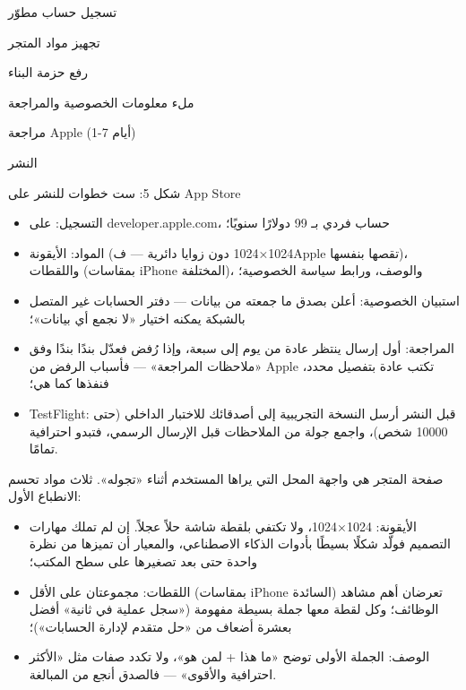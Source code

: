 
تسجيل حساب مطوّر

تجهيز مواد المتجر

رفع حزمة البناء

ملء معلومات الخصوصية والمراجعة

مراجعة Apple (1-7 أيام)

النشر

\begin{center}\small\color{gray}شكل 5: ست خطوات للنشر على App Store\end{center}

\begin{itemize}
  \item التسجيل: على developer.apple.com، حساب فردي بـ 99 دولارًا سنويًا؛
  \item المواد: الأيقونة (1024×1024 دون زوايا دائرية — فApple تقصها بنفسها)، واللقطات (بمقاسات iPhone المختلفة)، والوصف، ورابط سياسة الخصوصية؛
  \item استبيان الخصوصية: أعلن بصدق ما جمعته من بيانات — دفتر الحسابات غير المتصل بالشبكة يمكنه اختيار «لا نجمع أي بيانات»؛
  \item المراجعة: أول إرسال ينتظر عادة من يوم إلى سبعة، وإذا رُفض فعدّل بندًا بندًا وفق «ملاحظات المراجعة» — فأسباب الرفض من Apple تكتب عادة بتفصيل محدد، فنفذها كما هي؛
  \item TestFlight: قبل النشر أرسل النسخة التجريبية إلى أصدقائك للاختبار الداخلي (حتى 10000 شخص)، واجمع جولة من الملاحظات قبل الإرسال الرسمي، فتبدو احترافية تمامًا.
\end{itemize}


صفحة المتجر هي واجهة المحل التي يراها المستخدم أثناء «تجوله». ثلاث مواد تحسم الانطباع الأول:

\begin{itemize}
  \item الأيقونة: 1024×1024، ولا تكتفي بلقطة شاشة حلاً عجلاً. إن لم تملك مهارات التصميم فولّد شكلًا بسيطًا بأدوات الذكاء الاصطناعي، والمعيار أن تميزها من نظرة واحدة حتى بعد تصغيرها على سطح المكتب؛
  \item اللقطات: مجموعتان على الأقل (بمقاسات iPhone السائدة) تعرضان أهم مشاهد الوظائف؛ وكل لقطة معها جملة بسيطة مفهومة («سجل عملية في ثانية» أفضل بعشرة أضعاف من «حل متقدم لإدارة الحسابات»)؛
  \item الوصف: الجملة الأولى توضح «ما هذا + لمن هو»، ولا تكدد صفات مثل «الأكثر احترافية والأقوى» — فالصدق أنجع من المبالغة.
\end{itemize}

